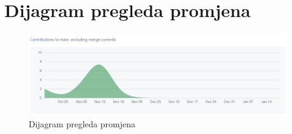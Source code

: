 					
		\eject
		\section*{Dijagram pregleda promjena}
		
		\begin{figure}[H]
			\includegraphics[scale=0.75]{slike/GIT.PNG} %
			\centering
			\caption{Dijagram pregleda promjena}
			\label{fig:promjene}
		\end{figure}
		
	